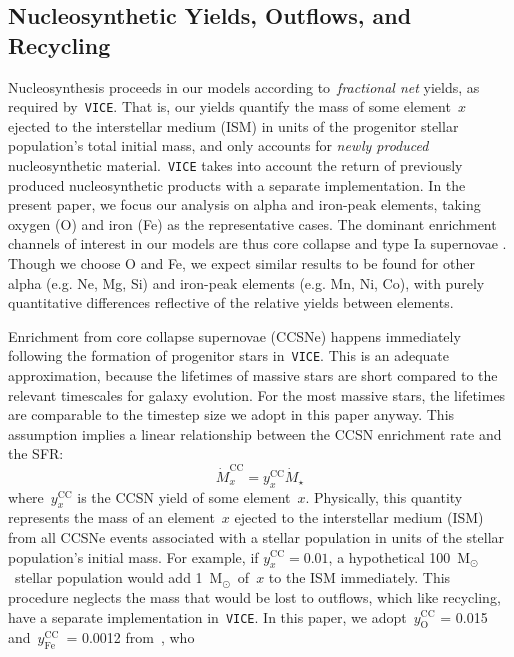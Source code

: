 \documentclass[fleqn, usenatbib]{mnras}
\newcommand{\msun}{\ensuremath{\text{M}_\odot}}
\begin{document}
\subsection{Nucleosynthetic Yields, Outflows, and Recycling} 
\label{sec:methods:yields} 
Nucleosynthesis proceeds in our models according to~\textit{fractional net} 
yields, as required by~\texttt{VICE}. That is, our yields quantify the mass 
of some element~$x$ ejected to the interstellar medium (ISM) in units of the 
progenitor stellar population's total initial mass, and only accounts for 
\textit{newly produced} nucleosynthetic material.~\texttt{VICE} takes into 
account the return of previously produced nucleosynthetic products with a 
separate implementation. In the present paper, we focus our analysis on 
alpha and iron-peak elements, taking oxygen (O) and iron (Fe) as the 
representative cases. The dominant enrichment channels of 
interest in our models are thus core collapse and type Ia supernovae 
\citep{Johnson2019}. Though we choose O and Fe, we expect 
similar results to be found for other alpha (e.g. Ne, Mg, Si) and iron-peak 
elements (e.g. Mn, Ni, Co), with purely quantitative differences reflective of 
the relative yields between elements. 
\par 
Enrichment from core collapse supernovae (CCSNe) happens immediately following 
the formation of progenitor stars in~\texttt{VICE}. This is an adequate 
approximation, because the lifetimes of massive stars are short compared to 
the relevant timescales for galaxy evolution. For the most massive stars, the 
lifetimes are comparable to the timestep size we adopt in this paper anyway. 
This assumption implies a linear relationship between the CCSN enrichment 
rate and the SFR: 
\begin{equation} 
\dot{M}_x^\text{CC} = y_x^\text{CC}\dot{M}_\star 
\end{equation} 
where~$y_x^\text{CC}$ is the CCSN yield of some element~$x$. Physically, this 
quantity represents the mass of an element~$x$ ejected to the interstellar 
medium (ISM) from all CCSNe events associated with a stellar population in 
units of the stellar population's initial mass. For example, if 
$y_x^\text{CC} = 0.01$, a hypothetical 100~\msun~stellar population would 
add 1~\msun~of~$x$ to the ISM immediately. This procedure neglects the mass 
that would be lost to outflows, which like recycling, have a separate 
implementation in~\texttt{VICE}. In this paper, we adopt~$y_\text{O}^\text{CC}$ 
= 0.015 and~$y_\text{Fe}^\text{CC}$~= 0.0012 from~\citet{Johnson2020}, who 
\end{document}
